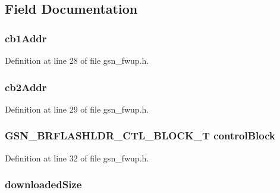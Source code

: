 \subsection{Field Documentation}
\hypertarget{a00082_a2c070b4c213bd0188ec289a902bd6b73}{
\subsubsection[{cb1Addr}]{ {\bf cb1Addr}}}
\label{a00082_a2c070b4c213bd0188ec289a902bd6b73}


Definition at line 28 of file gsn\_\-fwup.h.

\hypertarget{a00082_a11b562d4667b6205be4e6bd3abba3066}{
\subsubsection[{cb2Addr}]{ {\bf cb2Addr}}}
\label{a00082_a11b562d4667b6205be4e6bd3abba3066}


Definition at line 29 of file gsn\_\-fwup.h.

\hypertarget{a00082_a14389b4a9299ad6fda3aaddba908a5e6}{
\subsubsection[{controlBlock}]{\setlength{\rightskip}{0pt plus 5cm}GSN\_\-BRFLASHLDR\_\-CTL\_\-BLOCK\_\-T {\bf controlBlock}}}
\label{a00082_a14389b4a9299ad6fda3aaddba908a5e6}


Definition at line 32 of file gsn\_\-fwup.h.

\hypertarget{a00082_ab82e937482257876d6356427b796113d}{
\subsubsection[{downloadedSize}]{ {\bf downloadedSize}}}
\label{a00082_ab82e937482257876d6356427b796113d}


